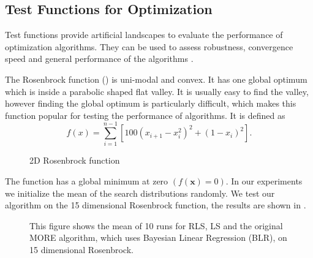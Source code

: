 
\subsection{Test Functions for Optimization}
\label{sec:test_func}
Test functions provide artificial landscapes to evaluate the
performance of optimization algorithms. They can be used to
assess robustness, convergence speed and general performance of the
algorithms \citep{molga2005test}.

The Rosenbrock function () is uni-modal and convex.
It has one global optimum which is inside a parabolic shaped flat valley.
It is usually easy to find the valley,
however finding the global optimum is particularly difficult,
which makes this function popular for testing the performance
of algorithms.
It is defined as 
\begin{equation*}
 f(x) = \sum^{n-1}_{i=1} [100(x_{i+1} - x_i^2)^2 + (1-x_i)^2].
\end{equation*}

\begin{figure}[ht!]
    \centering
    \caption{2D Rosenbrock function}
    \label{fig:rosenbrock}
\end{figure}

The function has a global minimum at zero $(f(\mathbf{x}) = 0)$.
In our experiments we initialize the mean of the search distributions
randomly. We test our algorithm on the 15 dimensional
Rosenbrock function, the results are shown in .

\begin{figure}[ht!]
     \centering
     \hspace{1cm}                       
     \caption{
       This figure shows the mean of 10 runs for RLS, LS and
       the original MORE algorithm, which uses
       Bayesian Linear Regression (BLR),
       on 15 dimensional Rosenbrock.
     }
     \label{fig:rosen_result}  
\end{figure}


